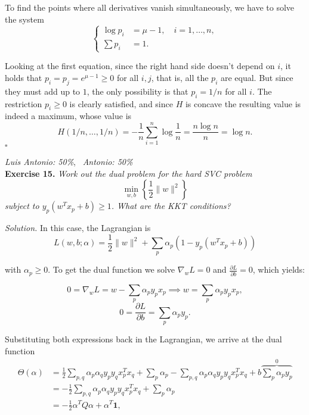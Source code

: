 \documentclass[12pt]{article}
\newcommand*{\QED}{\null\nobreak\hfill\ensuremath{\square}}%
\begin{document}
To find the points where all derivatives vanish simultaneously, we have to solve the system
\[\begin{cases}
    \log p_i &= \mu - 1, \quad i=1,\dots,n,\\
    \sum p_i &= 1.
\end{cases}
\]

Looking at the first equation, since the right hand side doesn't depend on $i$, it holds that $p_i=p_j= e^{\mu - 1}\geq 0$ for all $i,j$, that is, all the \( p_i \) are equal. But since they must add up to $1$, the only possibility is that $p_i=1/n$ for all $i$. The restriction $p_i\geq 0$ is clearly satisfied, and since $H$ is concave the resulting value is indeed a maximum, whose value is
\[
H(1/n,\dots, 1/n) = -\frac{1}{n}\sum_{i=1}^n \log{\frac{1}{n}} = \frac{n\log n}{n}=\log n.
\]
\QED

\vspace{1em}
\textit{Luis Antonio: 50\%}, \ \textit{Antonio: 50\%}\\
\textbf{Exercise 15. }\emph{Work out the dual problem for the hard SVC problem}
\[
\min_{w,b} \left\{\frac{1}{2}\|w\|^2\right\}
\]
\emph{subject to \( y_p(w^Tx_p + b) \geq 1 \). What are the KKT conditions? }

\textit{Solution.} In this case, the Lagrangian is
\[
L(w, b; \alpha)=\frac{1}{2}\|w\|^2 + \sum_{p} \alpha_p(1-y_p(w^Tx_p+b))
\]

with $\alpha_p\geq 0$. To get the dual function we solve $\nabla_w L = 0$ and $\frac{\partial L}{\partial b}=0$, which yields:

\[
0=\nabla_w L = w - \sum_p \alpha_p y_px_p \implies w = \sum_p \alpha_p y_px_p,
\]
\[
0=\frac{\partial L}{\partial b} = \sum_{p} \alpha_p y_p.
\]

Substituting both expressions back in the Lagrangian, we arrive at the dual function
\begin{align*}
\Theta(\alpha)&= \frac{1}{2} \sum_{p, q}\alpha_p \alpha_q y_p y_q x_p^T x_q + \sum_p \alpha_p - \sum_{p,q} \alpha_p \alpha_q y_p y_q x_p^T x_q + b \overbrace{\sum_p \alpha_py_p}^{0}\\
&= -\frac{1}{2}\sum_{p,q} \alpha_p \alpha_q y_p y_q x_p^T x_q + \sum_p \alpha_p\\
&= -\frac{1}{2}\alpha^TQ\alpha + \alpha^T\mathbf{1},
\end{align*}
\end{document}
